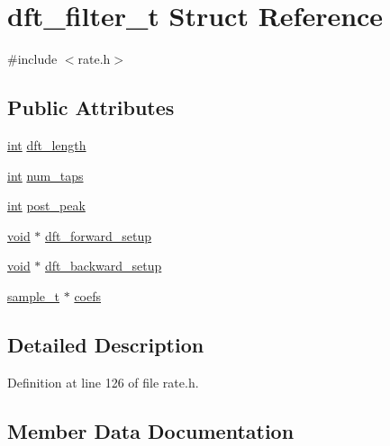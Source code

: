 \hypertarget{structdft__filter__t}{}\section{dft\+\_\+filter\+\_\+t Struct Reference}
\label{structdft__filter__t}


{\ttfamily \#include $<$rate.\+h$>$}

\subsection*{Public Attributes}
\begin{DoxyCompactItemize}
\item 
\hyperlink{xmltok_8h_a5a0d4a5641ce434f1d23533f2b2e6653}{int} \hyperlink{structdft__filter__t_ac0a7e11a9e26c9a8fab21c6ea0743d83}{dft\+\_\+length}
\item 
\hyperlink{xmltok_8h_a5a0d4a5641ce434f1d23533f2b2e6653}{int} \hyperlink{structdft__filter__t_ab38917fa1c8a49d1cc0cbfc94b54ad3d}{num\+\_\+taps}
\item 
\hyperlink{xmltok_8h_a5a0d4a5641ce434f1d23533f2b2e6653}{int} \hyperlink{structdft__filter__t_a7f23e4d4dafd9914a9c891809a88af9a}{post\+\_\+peak}
\item 
\hyperlink{sound_8c_ae35f5844602719cf66324f4de2a658b3}{void} $\ast$ \hyperlink{structdft__filter__t_a22109e9b248cf3ebf57ea693f2977ec7}{dft\+\_\+forward\+\_\+setup}
\item 
\hyperlink{sound_8c_ae35f5844602719cf66324f4de2a658b3}{void} $\ast$ \hyperlink{structdft__filter__t_ad0d3cbe82de5ac41f5677677bbe6b23f}{dft\+\_\+backward\+\_\+setup}
\item 
\hyperlink{soxr_8c_aeef50d4abead1cb3eef063fda4b721c0}{sample\+\_\+t} $\ast$ \hyperlink{structdft__filter__t_a377dcb7533ed8c11f3a8c16ae59b0553}{coefs}
\end{DoxyCompactItemize}


\subsection{Detailed Description}


Definition at line 126 of file rate.\+h.



\subsection{Member Data Documentation}
